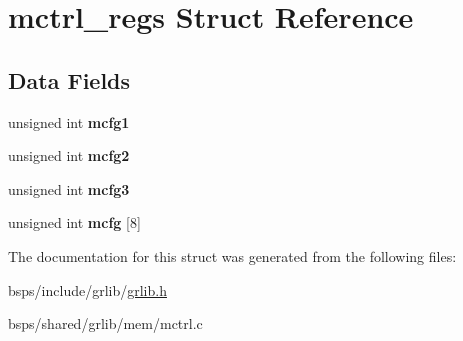 \hypertarget{structmctrl__regs}{}\section{mctrl\+\_\+regs Struct Reference}
\label{structmctrl__regs}
\subsection*{Data Fields}
\begin{DoxyCompactItemize}
\item 
\mbox{\label{structmctrl__regs_afb2a938eae391f4764cd9f68793c3746}} 
unsigned int {\bfseries mcfg1}
\item 
\mbox{\label{structmctrl__regs_af9be0dcd53ae6bc130bd26e35db8c0fd}} 
unsigned int {\bfseries mcfg2}
\item 
\mbox{\label{structmctrl__regs_aa12f3f39e32faa0a920f98b576b776e5}} 
unsigned int {\bfseries mcfg3}
\item 
\mbox{\label{structmctrl__regs_a2fe1e2284359038a5a6d4126eda9b37e}} 
unsigned int {\bfseries mcfg} \mbox{[}8\mbox{]}
\end{DoxyCompactItemize}


The documentation for this struct was generated from the following files\+:\begin{DoxyCompactItemize}
\item 
bsps/include/grlib/\mbox{\hyperlink{grlib_8h}{grlib.\+h}}\item 
bsps/shared/grlib/mem/mctrl.\+c\end{DoxyCompactItemize}
